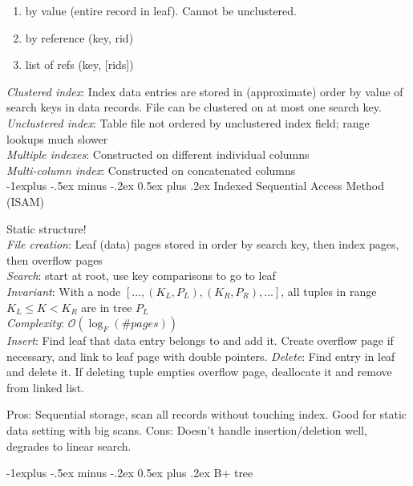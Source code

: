 \documentclass[10pt,landscape]{article}
\makeatletter
\renewcommand{\subsection}{\@startsection{subsection}{2}{0mm}%
                                {-1explus -.5ex minus -.2ex}%
                                {0.5ex plus .2ex}%
                                {\normalfont\normalsize\bfseries}}
\makeatother
\begin{document}
\begin{multicols}{3}
\begin{enumerate}
  \item by value (entire record in leaf). Cannot be unclustered.
  \item by reference (key, rid)
  \item list of refs (key, [rids])
\end{enumerate}

\textit{Clustered index}: Index data entries are stored in (approximate) order by value of search keys in data records. File can be clustered on at most one search key. \\
\textit{Unclustered index}: Table file not ordered by unclustered index field; range lookups much slower \\
\textit{Multiple indexes}: Constructed on different individual columns \\
\textit{Multi-column index}: Constructed on concatenated columns \\


\subsection{Indexed Sequential Access Method (ISAM)}

Static structure! \\
\textit{File creation}: Leaf (data) pages stored in order by search key, then index pages, then overflow pages \\
\textit{Search}: start at root, use key comparisons to go to leaf \\
\textit{Invariant}: With a node $[..., (K_L, P_L), (K_R, P_R), ...]$, all tuples in range $K_L \le K < K_R$ are in tree $P_L$ \\
\textit{Complexity}: $\mathcal{O}(\log_F(\# pages))$ \\
\textit{Insert}: Find leaf that data entry belongs to and add it. Create overflow page if necessary, and link to leaf page with double pointers.
\textit{Delete}: Find entry in leaf and delete it. If deleting tuple empties overflow page, deallocate it and remove from linked list.

Pros: Sequential storage, scan all records without touching index. Good for static data setting with big scans. Cons: Doesn't handle insertion/deletion well, degrades to linear search.

\subsection{B+ tree}


\end{multicols}
\end{document}
